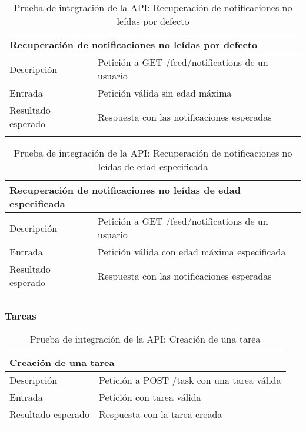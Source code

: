 \vspace{-10pt}
\begin{longtable}{|p{} p{}|}
    \hline
    \multicolumn{2}{|l|}{\textbf{Recuperación de notificaciones no leídas por defecto}} \\ \hline 
    Descripción                 & Petición a GET /feed/notifications de un usuario \\ \hline
    Entrada                     & Petición válida sin edad máxima \\ \hline
    Resultado esperado          & Respuesta con las notificaciones esperadas \\ \hline
    \caption{Prueba de integración de la API: Recuperación de notificaciones no leídas por defecto}
    \label{cp:i:api:recuperacion_notificaciones_no_leidas_por_defecto}
\end{longtable}

\vspace{-10pt}
\begin{longtable}{|p{} p{}|}
    \hline
    \multicolumn{2}{|l|}{\textbf{Recuperación de notificaciones no leídas de edad especificada}} \\ \hline 
    Descripción                 & Petición a GET /feed/notifications de un usuario \\ \hline
    Entrada                     & Petición válida con edad máxima especificada \\ \hline
    Resultado esperado          & Respuesta con las notificaciones esperadas \\ \hline
    \caption{Prueba de integración de la API: Recuperación de notificaciones no leídas de edad especificada}
    \label{cp:i:api:recuperacion_notificaciones_no_leidas_edad_especificada}
\end{longtable}

\vspace{-15pt}
\subsubsection{Tareas}

\begin{longtable}{|p{} p{}|}
    \hline
    \multicolumn{2}{|l|}{\textbf{Creación de una tarea}} \\ \hline 
    Descripción                 & Petición a POST /task con una tarea válida \\ \hline
    Entrada                     & Petición con tarea válida \\ \hline
    Resultado esperado          & Respuesta con la tarea creada \\ \hline
    \caption{Prueba de integración de la API: Creación de una tarea}
    \label{cp:i:api:creacion_tarea}
\end{longtable}

